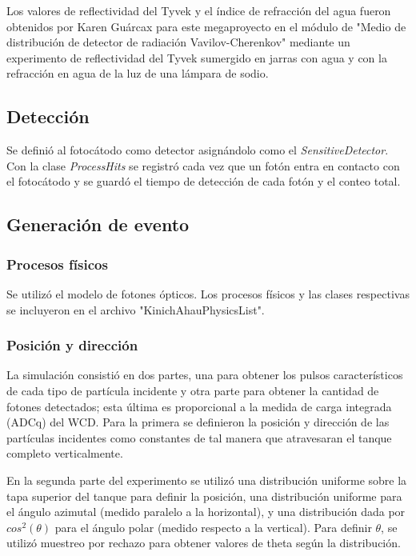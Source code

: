 \documentclass{book}
\begin{document}
Los valores de reflectividad del Tyvek y el \'indice de refracci\'on del agua fueron obtenidos por Karen Gu\'arcax para este megaproyecto en el m\'odulo de "Medio de distribuci\'on de detector de radiaci\'on Vavilov-Cherenkov" mediante un experimento de reflectividad del Tyvek sumergido en jarras con agua y con la refracci\'on en agua de la luz de una l\'ampara de sodio.

\subsection{Detecci\'on}
Se defini\'o al fotoc\'atodo como detector asign\'andolo como el \textit{SensitiveDetector}. Con la clase \textit{ProcessHits} se registr\'o cada vez que un fot\'on entra en contacto con el fotoc\'atodo y se guard\'o el tiempo de detecci\'on de cada fot\'on y el conteo total.

\subsection{Generaci\'on de evento}

\subsubsection{Procesos f\'isicos}
Se utiliz\'o el modelo de fotones \'opticos. Los procesos f\'isicos y las clases respectivas se incluyeron en el archivo "KinichAhauPhysicsList".

\subsubsection{Posici\'on y direcci\'on}
La simulaci\'on consisti\'o en dos partes, una para obtener los pulsos caracter\'isticos de cada tipo de part\'icula incidente y otra parte para obtener la cantidad de fotones detectados; esta \'ultima es proporcional a la medida de carga integrada (ADCq) del WCD. Para la primera se definieron la posici\'on y direcci\'on de las part\'iculas incidentes como constantes de tal manera que atravesaran el tanque completo verticalmente.

En la segunda parte del experimento se utiliz\'o una distribuci\'on uniforme sobre la tapa superior del tanque para definir la posici\'on, una distribuci\'on uniforme para el \'angulo azimutal (medido paralelo a la horizontal), y una distribuci\'on dada por $cos^2(\theta)$ para el \'angulo polar (medido respecto a la vertical). Para definir $\theta$, se utiliz\'o muestreo por rechazo para obtener valores de theta seg\'un la distribuci\'on.
\end{document}
